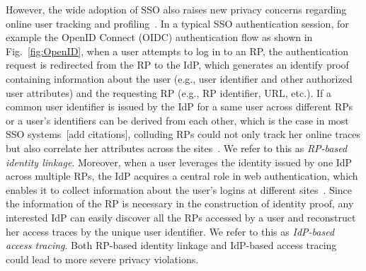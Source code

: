 However, the wide adoption of SSO also raises new privacy concerns regarding online user tracking and profiling~\cite{maler2008venn,NIST2017draft}. In a typical SSO authentication session, for example the OpenID Connect (OIDC) authentication flow as shown in Fig.~\ref{fig:OpenID}, when a user attempts to log in to an RP, the authentication request is redirected from the RP to the IdP, which generates an identify proof containing information about the user (e.g., user identifier and other authorized user attributes) and the requesting RP (e.g., RP identifier, URL, etc.). If a common user identifier is issued by the IdP for a same user across different RPs or a user's identifiers can be derived from each other, which is the case in most SSO systems~[add citations], colluding RPs could not only track her online traces but also correlate her attributes across the sites~\cite{maler2008venn}. We refer to this as {\em RP-based identity linkage}. Moreover, when a user leverages the identity issued by one IdP across multiple RPs, the IdP acquires a central role in web authentication, which enables it to collect information about the user's logins at different sites~\cite{maler2008venn}. Since the information of the RP is necessary in the construction of identity proof, any interested IdP can easily discover all the RPs accessed by a user and reconstruct her access traces by the unique user identifier. We refer to this as {\em IdP-based access tracing}. Both RP-based identity linkage and IdP-based access tracing could lead to more severe privacy violations.



